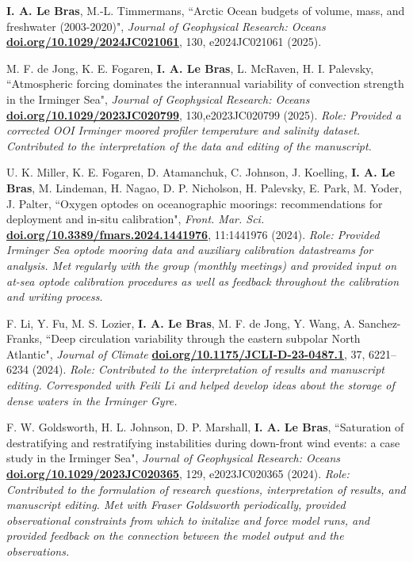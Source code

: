 \documentclass[paper=letter,fontsize=11pt]{scrartcl} %
\newcommand{\PaperEntry}[6]{
		\noindent #1, ``#2", \textit{#3} \textbf{#4}, #5 (#6).}
\begin{document}
\begin{etaremune}

\item \PaperEntry{\textbf{I. A. Le Bras}, M.-L. Timmermans}{Arctic Ocean budgets of volume, mass, and freshwater (2003-2020)}{Journal of Geophysical Research: Oceans}{\url{doi.org/10.1029/2024JC021061}}{130, e2024JC021061}{2025}

\item \PaperEntry{M. F. de Jong, K. E. Fogaren, \textbf{I. A. Le Bras}, L. McRaven, H. I. Palevsky}{Atmospheric forcing dominates the interannual variability of convection strength in the Irminger Sea}{Journal of Geophysical Research: Oceans}{\url{doi.org/10.1029/2023JC020799}}{130,e2023JC020799}{2025}
\emph{Role: Provided a corrected OOI Irminger moored profiler temperature and salinity dataset. Contributed to the interpretation of the data and editing of the manuscript.}\\

\item \PaperEntry{U. K. Miller, K. E. Fogaren, D. Atamanchuk, C. Johnson, J. Koelling, \textbf{I. A. Le Bras}, M. Lindeman, H. Nagao, D. P. Nicholson, H. Palevsky, E. Park, M. Yoder, J. Palter}{Oxygen optodes on oceanographic moorings: recommendations for deployment and in-situ calibration}{Front. Mar. Sci.}{\url{doi.org/10.3389/fmars.2024.1441976}}{11:1441976}{2024}
\emph{Role: Provided Irminger Sea optode mooring data and auxiliary calibration datastreams for analysis. Met regularly with the group (monthly meetings) and provided input on at-sea optode calibration procedures as well as feedback throughout the calibration and writing process.}\\

\item \PaperEntry{F. Li, Y. Fu, M. S. Lozier, \textbf{I. A. Le Bras}, M. F. de Jong, Y. Wang, A. Sanchez-Franks}{Deep circulation variability through the eastern subpolar North Atlantic}{Journal of Climate}{\url{doi.org/10.1175/JCLI-D-23-0487.1}}{37, 6221–6234}{2024} 
\emph{Role: Contributed to the interpretation of results and manuscript editing. Corresponded with Feili Li and helped develop ideas about the storage of dense waters in the Irminger Gyre.}\\

\item \PaperEntry{F. W. Goldsworth, H. L. Johnson, D. P. Marshall, \textbf{I. A. Le Bras}}{Saturation of destratifying and restratifying instabilities during down-front wind events: a case study in the Irminger Sea}{Journal of Geophysical Research: Oceans}{\url{doi.org/10.1029/2023JC020365}}{129, e2023JC020365}{2024} \emph{Role: Contributed to the formulation of research questions, interpretation of results, and manuscript editing. Met with Fraser Goldsworth periodically, provided observational constraints from which to initalize and force model runs, and provided feedback on the connection between the model output and the observations. }


\end{etaremune}
\end{document}
